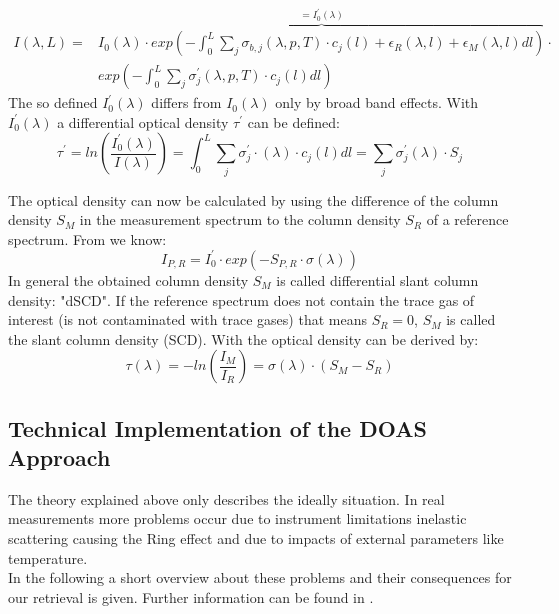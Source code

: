 \documentclass  [
  paper    = a4,
  BCOR     = 10mm,
  twoside,
  fontsize = 12pt,
  fleqn,
  toc      = bibnumbered,
  toc      = listofnumbered,
  numbers  = noendperiod,
  headings = normal,
  listof   = leveldown,
  version  = 3.03
]                                       {scrreprt}
\begin{document}
	\begin{align}
	I\left(\lambda,L\right) = &\overbrace{I_{0}\left(\lambda\right)\cdot exp\left(-\int^{L}_{0}\sum_{j}\sigma_{b,j}\left(\lambda,p,T\right)\cdot c_{j}\left(l\right)+\epsilon_R\left(\lambda,l\right)+\epsilon_{M}\left(\lambda,l\right)dl\right)}^{=I^{'}_0\left(\lambda\right)} \cdot \nonumber \\
	&exp\left(-\int^{L}_{0}\sum_{j}\sigma_{j}^{'}\left(\lambda,p,T\right)\cdot c_{j}\left(l\right)dl\right)
	\label{eq:bb}
	\end{align}	
	The so defined $I^{'}_0\left(\lambda\right)$ differs from $I_0\left(\lambda\right)$ only by broad band effects. With $I^{'}_0\left(\lambda\right)$ a differential optical density $\tau^{'}$ can be defined:
	\begin{equation}
	\tau^{'} = ln\left(\frac{I^{'}_0\left(\lambda\right)}{I\left(\lambda\right)}\right) = \int_{0}^{L} \sum_{j} \sigma^{'}_{j} \cdot \left(\lambda\right) \cdot c_{j}\left(l\right)dl = \sum_{j}\sigma^{'}_{j}\left(\lambda\right)\cdot S_{j}
	\label{eq:taustrich}
	\end{equation}
	
	The optical density can now be calculated by using the difference of the column density $S_{M}$ in the measurement spectrum to the column density $S_{R}$ of a reference spectrum. From  we know:	
	\begin{equation}
	I_{P,R} = I^{'}_{0}\cdot exp\left(-S_{P,R}\cdot\sigma\left(\lambda\right)\right)
	\label{eq:smr}
	\end{equation}
	In general the obtained column density $S_{M}$ is called differential slant column density: "dSCD". If the reference spectrum does not contain the trace gas of interest (is not contaminated with trace gases) that means $S_{R} = 0$, $S_{M}$ is called the slant column	density (SCD). 
	With  the optical density can be derived by:
	\begin{equation}
	\tau\left(\lambda\right) = -ln\left(\frac{I_{M}}{I_{R}}\right) = \sigma\left(\lambda\right)\cdot\left(S_{M}-S_{R}\right)
	\end{equation}

	
	
	\subsection{Technical Implementation of the DOAS Approach}
	The theory explained above only describes the ideally situation. In real measurements more problems occur due to instrument limitations inelastic scattering causing the Ring effect and due to impacts of external parameters like temperature.\\
	In the following a short overview about these problems and their consequences for our retrieval is given. Further information can be found in \cite{lubcke2014optical}.\\
\end{document}
